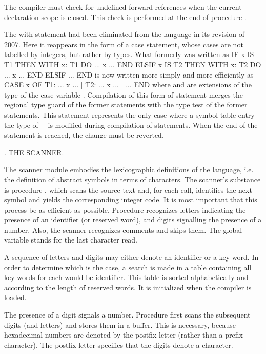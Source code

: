 \noindent The compiler must check for undefined forward references when the current declaration scope is closed. This check is performed at the end of procedure .

The with statement had been eliminated from the language in its revision of 2007. Here it reappears in the form of a case statement, whose cases are not labelled by integers, but rather by types. What formerly was written as
\begintt
IF x IS T1 THEN
  WITH x: T1 DO ... x ... END
ELSIF x IS T2 THEN
  WITH x: T2 DO ... x ... END
ELSIF ... END
\endtt
\eject
is now written more simply and more efficiently as
\begintt
CASE x OF
  T1: ... x ... |
  T2: ... x ... |
  ...
END
\endtt
where  and  are extensions of the type  of the case variable . Compilation of this form of  statement merges the regional type guard of the former  statements with the type test of the former  statements. This  statement represents the only case where a symbol table entry---the type of ---is modified during compilation of statements. When the end of the  statement is reached, the change must be reverted.

. THE SCANNER.

The scanner module  embodies the lexicographic definitions of the language, i.e. the definition of abstract symbols in terms of characters. The scanner's substance is procedure , which scans the source text and, for each call, identifies the next symbol and yields the corresponding integer code. It is most important that this process be as efficient as possible. Procedure  recognizes letters indicating the presence of an identifier (or reserved word), and digits signalling the presence of a number. Also, the scanner recognizes comments and skips them. The global variable  stands for the last character read.

A sequence of letters and digits may either denote an identifier or a key word. In order to determine which is the case, a search is made in a table containing all key words for each would-be identifier. This table is sorted alphabetically and according to the length of reserved words. It is initialized when the compiler is loaded.

The presence of a digit signals a number. Procedure  first scans the subsequent digits (and letters) and stores them in a buffer. This is necessary, because hexadecimal numbers are denoted by the postfix letter  (rather than a prefix character). The postfix letter  specifies that the digits denote a character.

